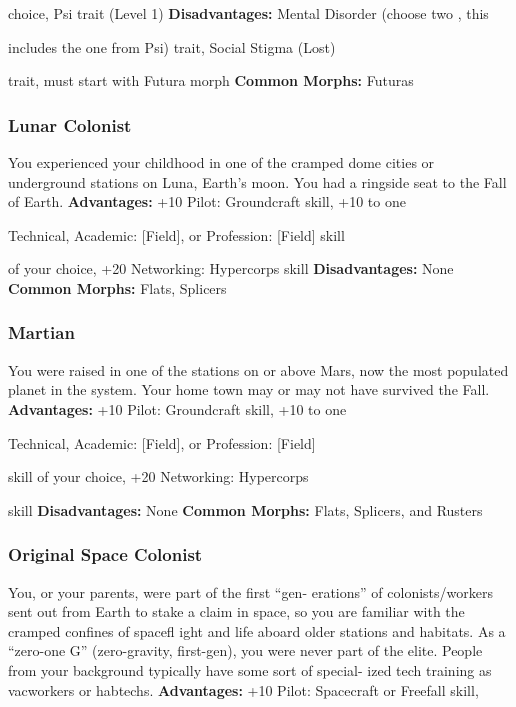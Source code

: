 choice, Psi trait (Level 1)
\textbf{Disadvantages:} Mental Disorder (choose two , this 

includes the one from Psi) trait, Social Stigma (Lost) 

trait, must start with Futura morph
\textbf{Common Morphs:} Futuras

\subsubsection{Lunar Colonist}

You experienced your childhood in one of the cramped 
dome cities or underground stations on Luna, Earth's 
moon. You had a ringside seat to the Fall of Earth.
\textbf{Advantages:} +10 Pilot: Groundcraft skill, +10 to one 

Technical, Academic: [Field], or Profession: [Field] skill 

of your choice, +20 Networking: Hypercorps skill
\textbf{Disadvantages:} None
\textbf{Common Morphs:} Flats, Splicers

\subsubsection{Martian}


You were raised in one of the stations on or above 
Mars, now the most populated planet in the system. 
Your home town may or may not have survived the Fall.
\textbf{Advantages:} +10 Pilot: Groundcraft skill, +10 to one 

Technical, Academic: [Field], or Profession: [Field] 

skill of your choice, +20 Networking: Hypercorps 

skill
\textbf{Disadvantages:} None
\textbf{Common Morphs:} Flats, Splicers, and Rusters

\subsubsection{Original Space Colonist}

You, or your parents, were part of the first  ``gen-
erations'' of colonists/workers sent out from Earth to 
stake a claim in space, so you are familiar with the 
cramped confines of spacefl ight and life aboard older 
stations and habitats. As a ``zero-one G'' (zero-gravity, 
first-gen), you were never part of the elite. People from 
your background typically have some sort of special-
ized tech training as vacworkers or habtechs.
\textbf{Advantages:} +10 Pilot: Spacecraft or Freefall skill, 


